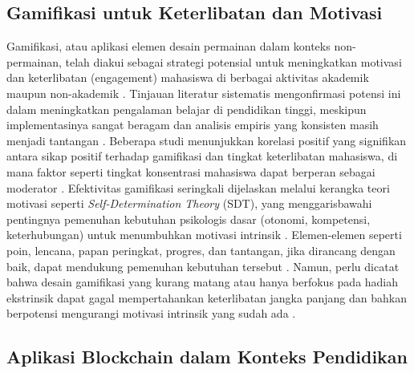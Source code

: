 \subsection{Gamifikasi untuk Keterlibatan dan Motivasi}
\label{subsec:gamifikasi_engagement}

Gamifikasi, atau aplikasi elemen desain permainan dalam konteks non-permainan, telah diakui sebagai strategi potensial untuk meningkatkan motivasi dan keterlibatan (engagement) mahasiswa di berbagai aktivitas akademik maupun non-akademik \cite{gamification_motivation_engagement_chemistry_2021, gamification_in_education_boosting_2025}. Tinjauan literatur sistematis mengonfirmasi potensi ini dalam meningkatkan pengalaman belajar di pendidikan tinggi, meskipun implementasinya sangat beragam dan analisis empiris yang konsisten masih menjadi tantangan \cite{gamification_higher_ed_review_2023}. Beberapa studi menunjukkan korelasi positif yang signifikan antara sikap positif terhadap gamifikasi dan tingkat keterlibatan mahasiswa, di mana faktor seperti tingkat konsentrasi mahasiswa dapat berperan sebagai moderator \cite{gamification_engagement_moderating_concentration_2024}. Efektivitas gamifikasi seringkali dijelaskan melalui kerangka teori motivasi seperti \textit{Self-Determination Theory} (SDT), yang menggarisbawahi pentingnya pemenuhan kebutuhan psikologis dasar (otonomi, kompetensi, keterhubungan) untuk menumbuhkan motivasi intrinsik \cite{sdt_gamification_review_2015, sdt_gamification_duolingo_2025}. Elemen-elemen seperti poin, lencana, papan peringkat, progres, dan tantangan, jika dirancang dengan baik, dapat mendukung pemenuhan kebutuhan tersebut \cite{gamification_elements_performance_2023}. Namun, perlu dicatat bahwa desain gamifikasi yang kurang matang atau hanya berfokus pada hadiah ekstrinsik dapat gagal mempertahankan keterlibatan jangka panjang dan bahkan berpotensi mengurangi motivasi intrinsik yang sudah ada \cite{gamification_in_education_boosting_2025, gamification_higher_ed_review_2023}.

\subsection{Aplikasi Blockchain dalam Konteks Pendidikan}
\label{subsec:blockchain_pendidikan}

